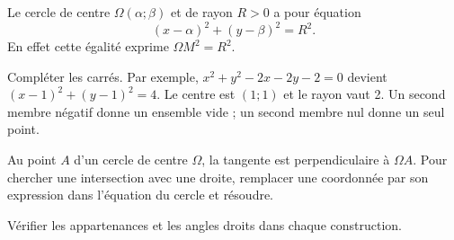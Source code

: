 \clearpage
{}
\begin{theoreme}
Le cercle de centre $\Omega(\alpha;\beta)$ et de rayon $R>0$ a pour équation
\[(x-\alpha)^2+(y-\beta)^2=R^2.\]
En effet cette égalité exprime $\Omega M^2=R^2$.
\end{theoreme}
\begin{savoirfaire}
Compléter les carrés. Par exemple,
$x^2+y^2-2x-2y-2=0$ devient $(x-1)^2+(y-1)^2=4$.
Le centre est $(1;1)$ et le rayon vaut 2. Un second membre négatif donne
un ensemble vide ; un second membre nul donne un seul point.
\end{savoirfaire}
\begin{center}
\par{}
\end{center}

\begin{propriete}
Au point $A$ d'un cercle de centre $\Omega$, la tangente est perpendiculaire
à $\Omega A$. Pour chercher une intersection avec une droite, remplacer
une coordonnée par son expression dans l'équation du cercle et résoudre.
\end{propriete}


\clearpage
{}
Vérifier les appartenances et les angles droits dans chaque construction.
\vspace{5mm}
\vspace{5mm}
\exercices

